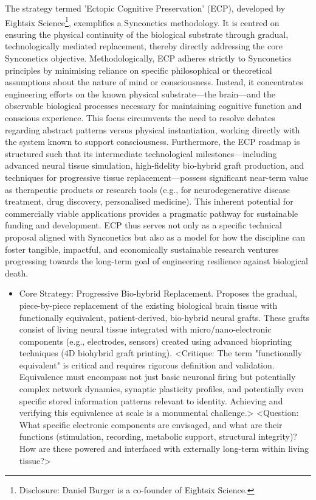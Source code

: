 \documentclass[10pt]{article}
\begin{document}
\begin{sloppypar}
  The strategy termed 'Ectopic Cognitive Preservation' (ECP), developed by Eightsix Science\footnote{Disclosure: Daniel Burger is a co-founder of Eightsix Science.}, exemplifies a Synconetics methodology. It is centred on ensuring the physical continuity of the biological substrate through gradual, technologically mediated replacement, thereby directly addressing the core Synconetics objective. Methodologically, ECP adheres strictly to Synconetics principles by minimising reliance on specific philosophical or theoretical assumptions about the nature of mind or consciousness. Instead, it concentrates engineering efforts on the known physical substrate—the brain—and the observable biological processes necessary for maintaining cognitive function and conscious experience. This focus circumvents the need to resolve debates regarding abstract patterns versus physical instantiation, working directly with the system known to support consciousness. Furthermore, the ECP roadmap is structured such that its intermediate technological milestones—including advanced neural tissue simulation, high-fidelity bio-hybrid graft production, and techniques for progressive tissue replacement—possess significant near-term value as therapeutic products or research tools (e.g., for neurodegenerative disease treatment, drug discovery, personalised medicine). This inherent potential for commercially viable applications provides a pragmatic pathway for sustainable funding and development. ECP thus serves not only as a specific technical proposal aligned with Synconetics but also as a model for how the discipline can foster tangible, impactful, and economically sustainable research ventures progressing towards the long-term goal of engineering resilience against biological death.

  \begin{itemize}
    \item Core Strategy: Progressive Bio-hybrid Replacement. Proposes the gradual, piece-by-piece replacement of the existing biological brain tissue with functionally equivalent, patient-derived, bio-hybrid neural grafts. These grafts consist of living neural tissue integrated with micro/nano-electronic components (e.g., electrodes, sensors) created using advanced bioprinting techniques (4D biohybrid graft printing). <Critique: The term "functionally equivalent" is critical and requires rigorous definition and validation. Equivalence must encompass not just basic neuronal firing but potentially complex network dynamics, synaptic plasticity profiles, and potentially even specific stored information patterns relevant to identity. Achieving and verifying this equivalence at scale is a monumental challenge.> <Question: What specific electronic components are envisaged, and what are their functions (stimulation, recording, metabolic support, structural integrity)? How are these powered and interfaced with externally long-term within living tissue?>


\end{itemize}
\end{sloppypar}
\end{document}
